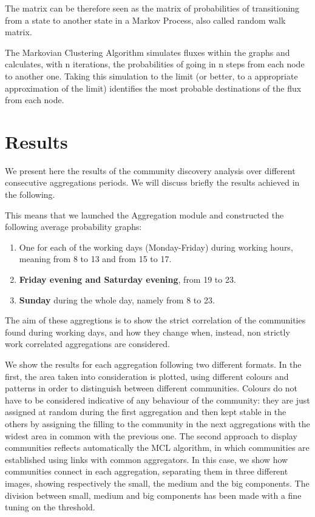\documentclass[12pt,a4paper]{article}
\begin{document}
The matrix can be therefore seen as the matrix of probabilities
of transitioning from a state to another state in
a Markov Process, also called random walk matrix.

The Markovian Clustering Algorithm simulates fluxes within the
graphs and calculates, with n iterations, the probabilities of going in
n steps from each node to another one. Taking this simulation to the limit
(or better, to a appropriate approximation of the limit) identifies
the most probable destinations of the flux from each node.



\newpage

\section{Results}
\label{results}

We present here the results of the community discovery analysis
over different consecutive aggregations periods. We will discuss briefly the results
achieved in the following.

This means that we launched the Aggregation module and constructed 
the following average probability graphs:
\begin{enumerate}
\item One for each of the working days (Monday-Friday) during working hours, meaning from 8 to 13 and from 15 to 17.
\item \textbf{Friday evening and Saturday evening}, from 19 to 23.
\item \textbf{Sunday} during the whole day, namely from 8 to 23.
\end{enumerate}
The aim of these aggregtions is to show the strict correlation of the communities found during working days, and how they change when, instead,
non strictly work correlated aggregations are considered. 

We show the results for each aggregation following two different formats.
In the first, the area taken into consideration is plotted, using different colours and patterns in order to distinguish between different communities. Colours do not have to be considered indicative of any behaviour of the community: they are just assigned at random during the first aggregation and then kept stable in the others by assigning the filling to the community in the next aggregations with the widest area in common with the previous one.
The second approach to display communities reflects automatically the MCL algorithm, in which communities are established using links with common aggregators. In this case, we show how communities connect in each aggregation, separating them in three different images, showing
respectively the small, the medium and the big components. The division between small, medium and big components has been made with a fine tuning on the threshold.
\end{document}
